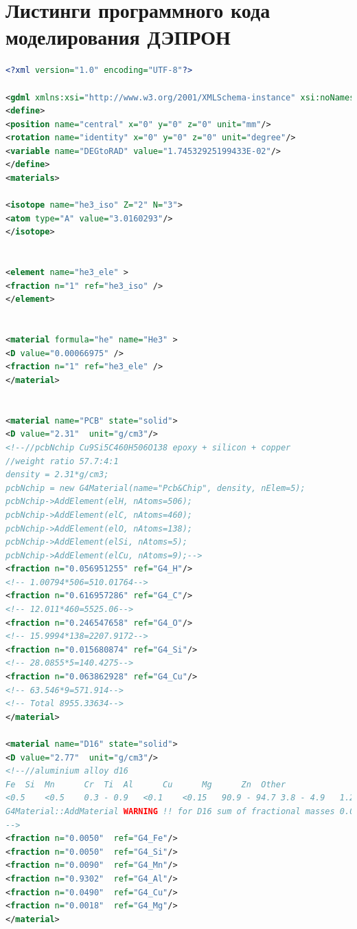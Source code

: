 \chapter{Листинги программного кода моделирования ДЭПРОН} \label{AppendixС}
\begin{lstlisting}[language=XML, firstline=1, lastline=89]
<?xml version="1.0" encoding="UTF-8"?>

<gdml xmlns:xsi="http://www.w3.org/2001/XMLSchema-instance" xsi:noNamespaceSchemaLocation="http://service-spi.web.cern.ch/service-spi/app/releases/GDML/schema/gdml.xsd">
<define>
<position name="central" x="0" y="0" z="0" unit="mm"/>
<rotation name="identity" x="0" y="0" z="0" unit="degree"/>
<variable name="DEGtoRAD" value="1.74532925199433E-02"/>
</define>
<materials>

<isotope name="he3_iso" Z="2" N="3">
<atom type="A" value="3.0160293"/>
</isotope> 


<element name="he3_ele" >
<fraction n="1" ref="he3_iso" />
</element>


<material formula="he" name="He3" >
<D value="0.00066975" />
<fraction n="1" ref="he3_ele" />
</material>


<material name="PCB" state="solid">
<D value="2.31"  unit="g/cm3"/>
<!--//pcbNchip Cu9Si5C460H506O138 epoxy + silicon + copper
//weight ratio 57.7:4:1
density = 2.31*g/cm3;
pcbNchip = new G4Material(name="Pcb&Chip", density, nElem=5);
pcbNchip->AddElement(elH, nAtoms=506);
pcbNchip->AddElement(elC, nAtoms=460);
pcbNchip->AddElement(elO, nAtoms=138);
pcbNchip->AddElement(elSi, nAtoms=5);
pcbNchip->AddElement(elCu, nAtoms=9);-->
<fraction n="0.056951255" ref="G4_H"/>
<!-- 1.00794*506=510.01764-->
<fraction n="0.616957286" ref="G4_C"/>
<!-- 12.011*460=5525.06-->
<fraction n="0.246547658" ref="G4_O"/>
<!-- 15.9994*138=2207.9172-->
<fraction n="0.015680874" ref="G4_Si"/>
<!-- 28.0855*5=140.4275-->
<fraction n="0.063862928" ref="G4_Cu"/>
<!-- 63.546*9=571.914-->
<!-- Total 8955.33634-->
</material>

<material name="D16" state="solid">
<D value="2.77"  unit="g/cm3"/>
<!--//aluminium alloy d16
Fe	Si	Mn		Cr	Ti	Al		Cu		Mg		Zn	Other				-
<0.5	<0.5	0.3 - 0.9	<0.1	<0.15	90.9 - 94.7	3.8 - 4.9	1.2 - 1.8	<0.25	all other 0.05; total 0.15	Ti+Zr < 0.2
G4Material::AddMaterial WARNING !! for D16 sum of fractional masses 0.0874738 is not 1 - results may be wrong
-->
<fraction n="0.0050"  ref="G4_Fe"/>
<fraction n="0.0050"  ref="G4_Si"/>
<fraction n="0.0090"  ref="G4_Mn"/>
<fraction n="0.9302"  ref="G4_Al"/>
<fraction n="0.0490"  ref="G4_Cu"/>
<fraction n="0.0018"  ref="G4_Mg"/>
</material>


\end{lstlisting}

